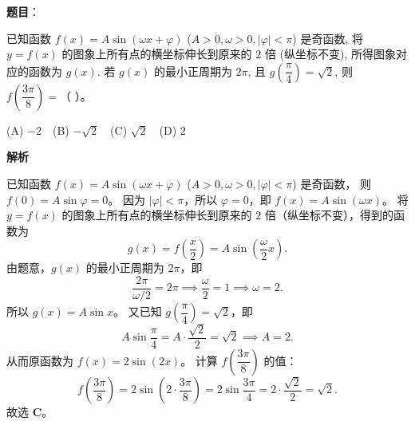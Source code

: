 \begin{answer}

\textbf{题目}：

已知函数 $f(x) = A \sin(\omega x + \varphi)$ ($A > 0, \omega > 0, |\varphi| < \pi$) 是奇函数, 将 $y = f(x)$ 的图象上所有点的横坐标伸长到原来的 $2$ 倍 (纵坐标不变), 所得图象对应的函数为 $g(x)$. 若 $g(x)$ 的最小正周期为 $2\pi$, 且 $g\left(\dfrac{\pi}{4}\right) = \sqrt{2}$, 则 $f\left(\dfrac{3\pi}{8}\right) =$（ ）。

(A) $-2$　(B) $-\sqrt{2}$　(C) $\sqrt{2}$　(D) $2$

\textbf{解析}

已知函数 $f(x) = A \sin(\omega x + \varphi)$ ($A > 0, \omega > 0, |\varphi| < \pi$) 是奇函数，
则 $f(0) = A \sin \varphi = 0$。
因为 $|\varphi| < \pi$，所以 $\varphi = 0$，即 $f(x) = A \sin(\omega x)$。
将 $y = f(x)$ 的图象上所有点的横坐标伸长到原来的 $2$ 倍（纵坐标不变），得到的函数为
\nopagebreak[4]
\[g(x) = f\left(\frac{x}{2}\right) = A \sin\left(\frac{\omega}{2} x\right).\]
由题意，$g(x)$ 的最小正周期为 $2\pi$，即
\nopagebreak[4]
\[\frac{2\pi}{\omega / 2} = 2\pi \implies \frac{\omega}{2} = 1 \implies \omega = 2.\]
所以 $g(x) = A \sin x$。
又已知 $g\left(\dfrac{\pi}{4}\right) = \sqrt{2}$，即
\nopagebreak[4]
\[A \sin\frac{\pi}{4} = A \cdot \frac{\sqrt{2}}{2} = \sqrt{2} \implies A = 2.\]
从而原函数为 $f(x) = 2 \sin(2x)$。
计算 $f\left(\dfrac{3\pi}{8}\right)$ 的值：
\nopagebreak[4]
\[f\left(\frac{3\pi}{8}\right) = 2 \sin\left(2 \cdot \frac{3\pi}{8}\right) = 2 \sin\frac{3\pi}{4} = 2 \cdot \frac{\sqrt{2}}{2} = \sqrt{2}.\]
故选 \textbf{C}。


\end{answer}
